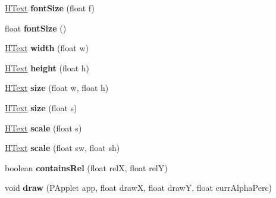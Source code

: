 \begin{DoxyCompactItemize}
\item 
\hypertarget{classhype_1_1drawable_1_1_h_text_a8972dfdc3677f1477da78d43a65c8bc9}{\hyperlink{classhype_1_1drawable_1_1_h_text}{H\-Text} {\bfseries font\-Size} (float f)}\label{classhype_1_1drawable_1_1_h_text_a8972dfdc3677f1477da78d43a65c8bc9}

\item 
\hypertarget{classhype_1_1drawable_1_1_h_text_aa0c33b11fb4c2adb4ff564fd8647df16}{float {\bfseries font\-Size} ()}\label{classhype_1_1drawable_1_1_h_text_aa0c33b11fb4c2adb4ff564fd8647df16}

\item 
\hypertarget{classhype_1_1drawable_1_1_h_text_a34d2ed02a16e5cfde7a1234c81752405}{\hyperlink{classhype_1_1drawable_1_1_h_text}{H\-Text} {\bfseries width} (float w)}\label{classhype_1_1drawable_1_1_h_text_a34d2ed02a16e5cfde7a1234c81752405}

\item 
\hypertarget{classhype_1_1drawable_1_1_h_text_aa5de72954d2566d756b8f215fec23a1b}{\hyperlink{classhype_1_1drawable_1_1_h_text}{H\-Text} {\bfseries height} (float h)}\label{classhype_1_1drawable_1_1_h_text_aa5de72954d2566d756b8f215fec23a1b}

\item 
\hypertarget{classhype_1_1drawable_1_1_h_text_a1a47daa77145971b6ef72a0fc90a7911}{\hyperlink{classhype_1_1drawable_1_1_h_text}{H\-Text} {\bfseries size} (float w, float h)}\label{classhype_1_1drawable_1_1_h_text_a1a47daa77145971b6ef72a0fc90a7911}

\item 
\hypertarget{classhype_1_1drawable_1_1_h_text_a37c3535711e3a07e3b4b7aaaecbbf717}{\hyperlink{classhype_1_1drawable_1_1_h_text}{H\-Text} {\bfseries size} (float s)}\label{classhype_1_1drawable_1_1_h_text_a37c3535711e3a07e3b4b7aaaecbbf717}

\item 
\hypertarget{classhype_1_1drawable_1_1_h_text_a8480b4af6a3e5aa6721f1cf4e3653f5e}{\hyperlink{classhype_1_1drawable_1_1_h_text}{H\-Text} {\bfseries scale} (float s)}\label{classhype_1_1drawable_1_1_h_text_a8480b4af6a3e5aa6721f1cf4e3653f5e}

\item 
\hypertarget{classhype_1_1drawable_1_1_h_text_ad998eb925e706587a3e01da5b0f774fe}{\hyperlink{classhype_1_1drawable_1_1_h_text}{H\-Text} {\bfseries scale} (float sw, float sh)}\label{classhype_1_1drawable_1_1_h_text_ad998eb925e706587a3e01da5b0f774fe}

\item 
\hypertarget{classhype_1_1drawable_1_1_h_text_a0e58a8da08b4b63657be00cbc8a317ec}{boolean {\bfseries contains\-Rel} (float rel\-X, float rel\-Y)}\label{classhype_1_1drawable_1_1_h_text_a0e58a8da08b4b63657be00cbc8a317ec}

\item 
\hypertarget{classhype_1_1drawable_1_1_h_text_ac144e0c1a097b3fc87d88e4af5fb36a3}{void {\bfseries draw} (P\-Applet app, float draw\-X, float draw\-Y, float curr\-Alpha\-Perc)}\label{classhype_1_1drawable_1_1_h_text_ac144e0c1a097b3fc87d88e4af5fb36a3}

\end{DoxyCompactItemize}
